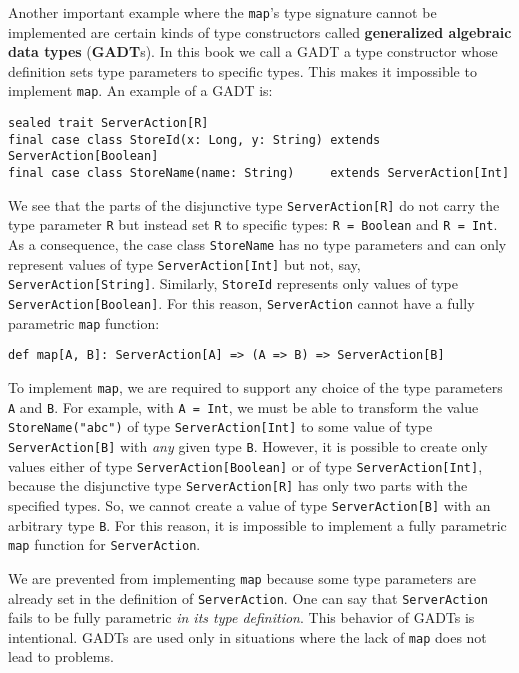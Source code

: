 Another important example where the \lstinline!map!\textsf{'}s type signature
cannot be implemented are certain kinds of type constructors called
\textbf{generalized
algebraic data types} (\textbf{GADT}s). In this
book we call a GADT a type constructor whose definition sets type
parameters to specific types. This makes it impossible to implement
\lstinline!map!. An example of a GADT is:
\begin{lstlisting}
sealed trait ServerAction[R]
final case class StoreId(x: Long, y: String) extends ServerAction[Boolean]
final case class StoreName(name: String)     extends ServerAction[Int]
\end{lstlisting}
We see that the parts of the disjunctive type \lstinline!ServerAction[R]!
do not carry the type parameter \lstinline!R! but instead set \lstinline!R!
to specific types: \lstinline!R = Boolean! and \lstinline!R = Int!.
As a consequence, the case class \lstinline!StoreName! has no type
parameters and can only represent values of type \lstinline!ServerAction[Int]!
but not, say, \lstinline!ServerAction[String]!. Similarly, \lstinline!StoreId!
represents only values of type \lstinline!ServerAction[Boolean]!.
For this reason, \lstinline!ServerAction! cannot have a fully parametric
\lstinline!map! function:
\begin{lstlisting}
def map[A, B]: ServerAction[A] => (A => B) => ServerAction[B]
\end{lstlisting}
To implement \lstinline!map!, we are required to support any choice
of the type parameters \lstinline!A! and \lstinline!B!. For example,
with \lstinline!A = Int!, we must be able to transform the value
\lstinline!StoreName("abc")! of type \lstinline!ServerAction[Int]!
to some value of type \lstinline!ServerAction[B]! with \emph{any}
given type \lstinline!B!. However, it is possible to create only
values either of type \lstinline!ServerAction[Boolean]! or of type
\lstinline!ServerAction[Int]!, because the disjunctive type \lstinline!ServerAction[R]!
has only two parts with the specified types. So, we cannot create
a value of type \lstinline!ServerAction[B]! with an arbitrary type
\lstinline!B!. For this reason, it is impossible to implement a fully
parametric \lstinline!map! function for \lstinline!ServerAction!.

We are prevented from implementing \lstinline!map! because some type
parameters are already set in the definition of \lstinline!ServerAction!.
One can say that \lstinline!ServerAction! fails to be fully parametric
\emph{in its type definition}. This behavior of GADTs is intentional.
GADTs are used only in situations where the lack of \lstinline!map!
does not lead to problems.

